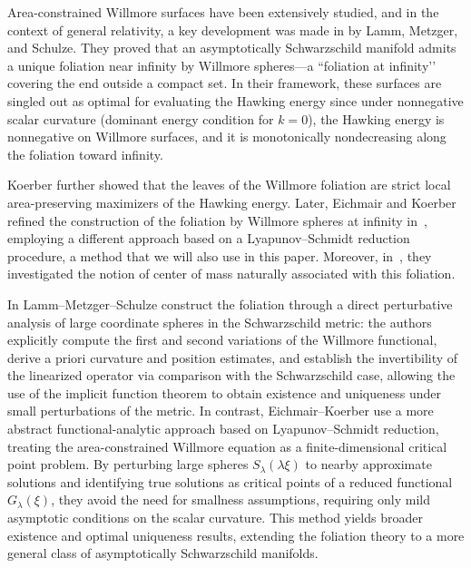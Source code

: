 \documentclass[12pt,a4paper]{amsart}
\theoremstyle{plain}
\theoremstyle{definition}
\begin{document}
Area-constrained Willmore surfaces have been extensively studied, and in the context of general relativity, a key development was made in \cite{willflat} by Lamm, Metzger, and Schulze. They proved that an asymptotically Schwarzschild manifold admits a unique foliation near infinity by Willmore spheres—a “foliation at infinity’’ covering the end outside a compact set. In their framework, these surfaces are singled out as optimal for evaluating the Hawking energy since under nonnegative scalar curvature (dominant energy condition for $k=0$), the Hawking energy is nonnegative on Willmore surfaces, and it is monotonically nondecreasing along the foliation toward infinity.

Koerber \cite{Thomas} further showed that the leaves of the Willmore foliation are strict local area-preserving maximizers of the Hawking energy. Later, Eichmair and Koerber refined the construction of the foliation by Willmore spheres at infinity in~\cite{eichko}, employing a different approach based on a Lyapunov--Schmidt reduction procedure, a method that we will also use in this paper. Moreover, in~\cite{willcen}, they investigated the notion of center of mass naturally associated with this foliation.


In \cite{willflat} Lamm--Metzger--Schulze construct the foliation  through a direct perturbative analysis of large coordinate spheres in the Schwarzschild metric: the authors explicitly compute the first and second variations of the Willmore functional, derive a priori curvature and position estimates, and establish the invertibility of the linearized operator via comparison with the Schwarzschild case, allowing the use of the implicit function theorem to obtain existence and uniqueness under small perturbations of the metric. In contrast, Eichmair--Koerber \cite{eichko} use a more abstract functional-analytic approach based on Lyapunov--Schmidt reduction, treating the area-constrained Willmore equation as a finite-dimensional critical point problem. By perturbing large spheres $S_\lambda(\lambda \xi)$ to nearby approximate solutions and identifying true solutions as critical points of a reduced functional $G_\lambda(\xi)$, they avoid the need for smallness assumptions, requiring only mild asymptotic conditions on the scalar curvature. This method yields broader existence and optimal uniqueness results, extending the foliation theory to a more general class of asymptotically Schwarzschild manifolds.
\end{document}
